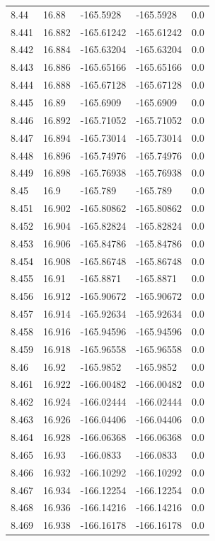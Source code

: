 \begin{tabular}{lllll}
8.44 & 16.88 & -165.5928 & -165.5928 & 0.0 \\
8.441 & 16.882 & -165.61242 & -165.61242 & 0.0 \\
8.442 & 16.884 & -165.63204 & -165.63204 & 0.0 \\
8.443 & 16.886 & -165.65166 & -165.65166 & 0.0 \\
8.444 & 16.888 & -165.67128 & -165.67128 & 0.0 \\
8.445 & 16.89 & -165.6909 & -165.6909 & 0.0 \\
8.446 & 16.892 & -165.71052 & -165.71052 & 0.0 \\
8.447 & 16.894 & -165.73014 & -165.73014 & 0.0 \\
8.448 & 16.896 & -165.74976 & -165.74976 & 0.0 \\
8.449 & 16.898 & -165.76938 & -165.76938 & 0.0 \\
8.45 & 16.9 & -165.789 & -165.789 & 0.0 \\
8.451 & 16.902 & -165.80862 & -165.80862 & 0.0 \\
8.452 & 16.904 & -165.82824 & -165.82824 & 0.0 \\
8.453 & 16.906 & -165.84786 & -165.84786 & 0.0 \\
8.454 & 16.908 & -165.86748 & -165.86748 & 0.0 \\
8.455 & 16.91 & -165.8871 & -165.8871 & 0.0 \\
8.456 & 16.912 & -165.90672 & -165.90672 & 0.0 \\
8.457 & 16.914 & -165.92634 & -165.92634 & 0.0 \\
8.458 & 16.916 & -165.94596 & -165.94596 & 0.0 \\
8.459 & 16.918 & -165.96558 & -165.96558 & 0.0 \\
8.46 & 16.92 & -165.9852 & -165.9852 & 0.0 \\
8.461 & 16.922 & -166.00482 & -166.00482 & 0.0 \\
8.462 & 16.924 & -166.02444 & -166.02444 & 0.0 \\
8.463 & 16.926 & -166.04406 & -166.04406 & 0.0 \\
8.464 & 16.928 & -166.06368 & -166.06368 & 0.0 \\
8.465 & 16.93 & -166.0833 & -166.0833 & 0.0 \\
8.466 & 16.932 & -166.10292 & -166.10292 & 0.0 \\
8.467 & 16.934 & -166.12254 & -166.12254 & 0.0 \\
8.468 & 16.936 & -166.14216 & -166.14216 & 0.0 \\
8.469 & 16.938 & -166.16178 & -166.16178 & 0.0 \\

\end{tabular}
